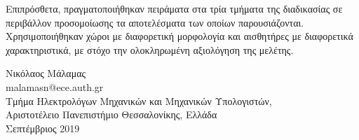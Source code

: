 Επιπρόσθετα, πραγματοποιήθηκαν πειράματα στα τρία τμήματα της διαδικασίας σε περιβάλλον προσομοίωσης τα αποτελέσματα των οποίων παρουσιάζονται. Χρησιμοποιήθηκαν χώροι με διαφορετική μορφολογία και αισθητήρες με διαφορετικά χαρακτηριστικά, με στόχο την ολοκληρωμένη αξιολόγηση της μελέτης.


\begin{flushright}
  \vspace{1.5cm}
  Νικόλαος Μάλαμας
  \\
  malamasn@ece.auth.gr
  \\
  Τμήμα Ηλεκτρολόγων Μηχανικών και Μηχανικών Υπολογιστών,
  \\
  Αριστοτέλειο Πανεπιστήμιο Θεσσαλονίκης, Ελλάδα
  \\
  Σεπτέμβριος 2019
\end{flushright}
